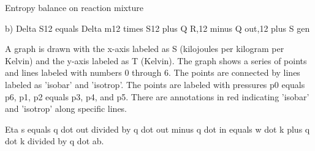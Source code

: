 Entropy balance on reaction mixture

b) Delta S12 equals Delta m12 times S12 plus Q R,12 minus Q out,12 plus S gen

A graph is drawn with the x-axis labeled as S (kilojoules per kilogram per Kelvin) and the y-axis labeled as T (Kelvin). The graph shows a series of points and lines labeled with numbers 0 through 6. The points are connected by lines labeled as 'isobar' and 'isotrop'. The points are labeled with pressures p0 equals p6, p1, p2 equals p3, p4, and p5. There are annotations in red indicating 'isobar' and 'isotrop' along specific lines.

Eta s equals q dot out divided by q dot out minus q dot in equals w dot k plus q dot k divided by q dot ab.